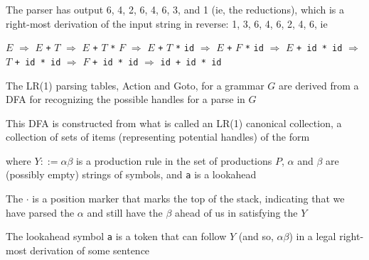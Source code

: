 \documentclass[8pt,a4paper,compress]{beamer}
\newcommand{\mm}[1]{$#1$}
\newenvironment{spaced}
{
\smallskip
\hspace{.5cm}
\begin{minipage}[c]{\textwidth}
}
{
\end{minipage}
\smallskip
}
\begin{document}
\begin{frame}[fragile]
\pause

The parser has output 6, 4, 2, 6, 4, 6, 3, and 1 (ie, the reductions), which is a right-most derivation of the input string in reverse: 1, 3, 6, 4, 6, 2, 4, 6, ie

\text{ }
\begin{spaced}
\begin{production}
\underline{\mm{E}} \mm{\Rightarrow} \mm{E} \lstinline{+} \underline{\mm{T}}
   \mm{\Rightarrow} \mm{E} \lstinline{+} \mm{T} \lstinline{*} \underline{\mm{F}}
   \mm{\Rightarrow} \mm{E} \lstinline{+} \underline{\mm{T}} \lstinline{*} \lstinline{id}
   \mm{\Rightarrow} \mm{E} \lstinline{+} \underline{\mm{F}} \lstinline{*} \lstinline{id}
   \mm{\Rightarrow} \underline{\mm{E}} \lstinline{+ id * id}
   \mm{\Rightarrow} \underline{\mm{T}} \lstinline{+ id * id}
   \mm{\Rightarrow} \underline{\mm{F}} \lstinline{+ id * id}
   \mm{\Rightarrow} \lstinline{id + id * id}
\end{production}
\end{spaced}
\end{frame}

\begin{frame}[fragile]
\pause

The LR(1) parsing tables, Action and Goto, for a grammar $G$ are derived from a DFA for recognizing the possible handles for a parse in $G$

\pause
\bigskip

This DFA is constructed from what is called an LR(1) canonical collection, a collection of sets of items (representing potential handles) of the form

\text{ }
\begin{spaced}
\begin{production}
[Y ::= \mm{\alpha \cdot \beta}, \lstinline{a}]
\end{production}
\end{spaced}

\noindent where $Y ::= \alpha \beta$ is a production rule in the set of productions $P$, $\alpha$ and $\beta$ are (possibly empty) strings of symbols, and \lstinline{a} is a lookahead

\pause
\bigskip

The $\cdot$ is a position marker that marks the top of the stack, indicating that we have parsed the $\alpha$ and still have the $\beta$ ahead of us in satisfying the $Y$

\pause
\bigskip

The lookahead symbol \lstinline{a} is a token that can follow $Y$ (and so, $\alpha \beta$) in a legal right-most derivation of some sentence
\end{frame}
\end{document}
